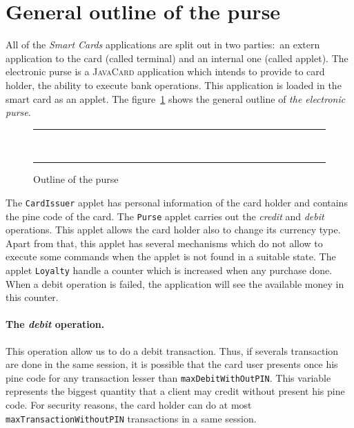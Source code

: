 \section{General outline of the purse}
All of the \textit{Smart Cards} applications are split out in two
parties$:$ an extern application to the card (called terminal) and an
internal one (called applet). The electronic purse is a
\textsc{JavaCard} application which intends to provide to card holder,
the ability to execute bank operations. This application is loaded in
the smart card as an applet. The figure~\ref{fig-cas-pur} shows the
general outline of \textit{the electronic purse}.




\begin{center}
\begin{figure}[hbt]
\rule{\linewidth}{0.3mm}
\\[2.5ex]
\centering
{}
\caption{Outline of the purse}
\label{fig-cas-pur}
\rule{\linewidth}{0.3mm}
\end{figure}
\end{center}




The  \texttt{CardIssuer} applet has personal information of the card
holder and contains the pine code of the card. The \texttt{Purse}
applet carries out the \textit{credit} and \textit{debit}
operations. This applet allows the card holder also to change its
currency type. Apart from that, this applet has several mechanisms
which do not allow to execute some commands when the applet is not
found in a suitable state. The applet \texttt{Loyalty} handle a
counter which is increased when any purchase done. When
a debit operation is failed, the application will see the available
money in this counter.


\paragraph{The \textit{debit} operation.}
This operation allow us to do a debit transaction. Thus, if
severals transaction are done in the same session, it is possible that 
the card user presents once his pine code for any transaction lesser than
\texttt{maxDebitWithOutPIN}. This variable represents the biggest
quantity that a client may credit without present his pine code. For
security reasons, the card holder can do at most
\texttt{maxTransactionWithoutPIN} transactions in a same session. 


